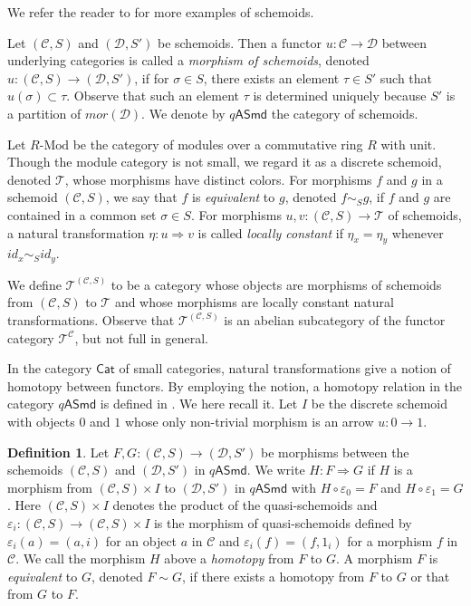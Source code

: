 \documentclass{amsart}
\theoremstyle{definition}
\newtheorem{defn}[thm]{Definition}
\theoremstyle{remark}
\newcommand{\K}{R}%
\newcommand{\C}{{\mathcal C}}
\newcommand{\T}{{\mathcal T}}
\newcommand{\e}{\varepsilon}
\newcommand{\D}{\mathcal{D}}
\begin{document}
We refer the reader to \cite[Section 2]{K-M} for more examples of schemoids.  

Let $(\C, S)$ and $(\D, S')$ be schemoids. Then a functor $u : \C \to \D$ between underlying categories is called a 
{\it morphism of schemoids}, denoted $u :  (\C, S) \to (\D, S')$, if for $\sigma \in S$, there exists an element $\tau \in S'$ 
such that $u(\sigma) \subset \tau$. Observe that such an element $\tau$ is determined uniquely because $S'$ is a partition of 
$mor(\D)$. We denote by $q\mathsf{ASmd}$ the category of schemoids. 

Let $R\text{-Mod}$ be the category of modules over a commutative ring $\K$ with unit. 
Though the module category is not small, we regard it as a discrete schemoid, denoted $\T$, 
whose morphisms have distinct colors. 
For morphisms $f$ and $g$ in a schemoid $(\C, S)$, 
we say that  $f$ is {\it equivalent} to $g$, denoted $f \sim_S g$, if $f$ and $g$ are contained in a common set 
$\sigma \in S$. 
For morphisms  $u, v : (\C,S) \to \T$ of schemoids, a natural transformation 
$\eta : u   \Rightarrow  v$ is called {\it locally constant} if $\eta_x = \eta_y$ whenever $id_x \sim_S id_y$.  

We define $\T^{(\C,S)}$ to be a category whose objects are morphisms of schemoids from $(\C,S)$ to $\T$ and 
whose morphisms are locally constant natural transformations. Observe that $\T^{(\C,S)}$ is an abelian 
subcategory of the functor category $\T^{\C}$, but not full in general. 

In the category $\mathsf{Cat}$ of small categories, natural transformations give a notion of homotopy between functors. 
By employing the notion, a homotopy relation in the category $q\mathsf{ASmd}$ is defined in \cite{K}. We here recall it. 
Let $I$ be the discrete schemoid with objects $0$ and $1$ whose only non-trivial morphism is an arrow 
$u : 0 \to 1$.

\begin{defn}\label{defn:Homotopy}  
Let $F, G : (\C, S) \to (\D, S')$ be morphisms between the schemoids $(\C, S)$ and  $(\D, S')$ in $q\mathsf{ASmd}$. 
We write $H: F \Rightarrow G$ if $H$ is a morphism from  $(\C, S) \times I$ to $(\D, S')$ in  $q\mathsf{ASmd}$ with  
$H\circ \e_0 = F$ and $H\circ \e_1 = G$. Here $(\C, S) \times I$ denotes the product of the quasi-schemoids 
and 
$\e_i : (\C, S) \to (\C, S) \times I$ is the morphism of quasi-schemoids defined by 
$\e_i(a) = (a, i)$ for an object $a$ in $\C$ and $\e_i(f)= (f,  1_i)$ for a morphism $f$ in $\C$.  
We call the morphism $H$ above a {\it homotopy} from $F$ to $G$. 
A morphism $F$ is {\it equivalent} to $G$, 
denoted $F\sim G$, if there exists a homotopy from $F$ to $G$ or that from $G$ to $F$. 
\end{defn}
\end{document}

